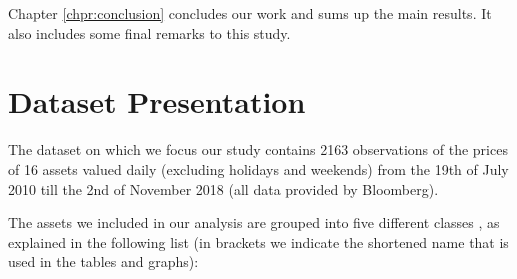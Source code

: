 \bigskip
\noindent
Chapter \ref{chpr:conclusion} concludes our work and sums up the main results. It also includes some final remarks to this study.

\bigskip

\section{Dataset  Presentation}
\bigskip
The dataset on which we focus our study contains 2163 observations of the prices of 16 assets valued daily (excluding holidays and weekends) from the 19th of July 2010 till the 2nd of November 2018 (all data provided by Bloomberg).

The assets we included in our analysis are grouped into five different classes , as explained in the following list (in brackets we indicate the shortened name that is used in the tables and graphs):

